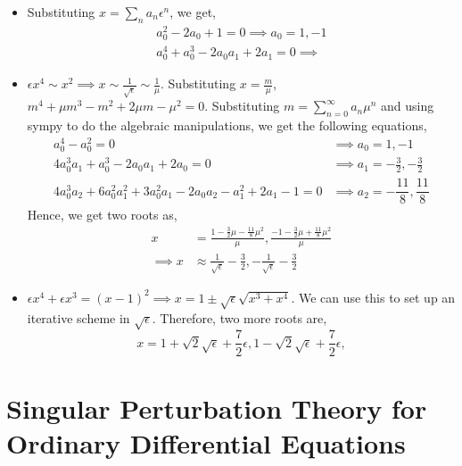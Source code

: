 \documentclass[a4paper,11pt]{article}
\begin{document}
\begin{itemize}
	\item Substituting $ x = \sum_{n} a_n \epsilon^n $, we get,
	\begin{align*}
	a_0^2 -2a_0 +1 = 0 \implies a_0 = 1,-1 \\
	a_0^4 +a_0^3 - 2 a_0 a_1 + 2 a_1 = 0 \implies 
	\end{align*}
	\item $ \epsilon x^4 \sim x^2 \implies x \sim \frac{1}{\sqrt{\epsilon}} \sim \frac{1}{\mu} $. Substituting $ x = \frac{m}{\mu} $, $ m^4 + \mu m^3 - m^2 + 2 \mu m - \mu^2 = 0$. Substituting $ m = \sum_{n=0}^{\infty} a_n \mu^n $ and using sympy to do the algebraic manipulations, we get the following equations,
	\begin{align*}
	a_0^4 - a_0^2 = 0 &\implies a_0 = 1,-1 \\
	4 a_0^3 a_1 + a_0^3 - 2 a_0 a_1 + 2 a_0 = 0 &\implies a_1 = -\frac{3}{2}, -\frac{3}{2} \\
	4 a_0^3 a_2 + 6 a_0^2 a_1^2 + 3 a_0^2 a_1 -2 a_0 a_2 - a_1^2 +2 a_1 - 1 = 0 &\implies a_2 = -\dfrac{11}{8}, \dfrac{11}{8}
	\end{align*}
	Hence, we get two roots as,
	\begin{align*}
	x &= \frac{1 -\frac{3}{2}\mu - \frac{11}{8} \mu^2}{\mu}, \frac{-1 -\frac{3}{2}\mu + \frac{11}{8} \mu^2}{\mu} \\
	\implies x &\approx \frac{1}{\sqrt{\epsilon}} -\frac{3}{2}, -\frac{1}{\sqrt{\epsilon}} -\frac{3}{2}
	\end{align*}
	\item $ \epsilon x^4 + \epsilon x^3 = (x-1)^2 \implies x = 1 \pm \sqrt{\epsilon} \sqrt{x^3 + x^4}$. We can use this to set up an iterative scheme in $ \sqrt{\epsilon} $. Therefore, two more roots are,
	\begin{equation*}
	x = 1 + \sqrt{2} \sqrt{\epsilon} + \dfrac{7}{2} \epsilon, 1 - \sqrt{2} \sqrt{\epsilon} + \dfrac{7}{2} \epsilon, 
	\end{equation*}
\end{itemize}
	
\section{Singular Perturbation Theory for Ordinary Differential Equations}
\end{document}
